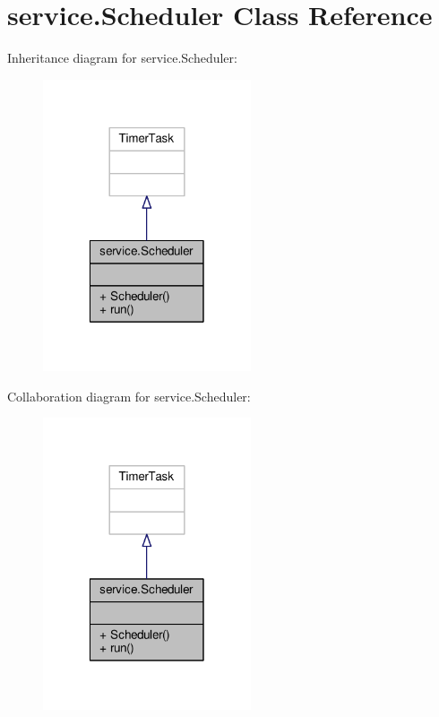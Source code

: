 \hypertarget{classservice_1_1Scheduler}{\section{service.\-Scheduler Class Reference}
\label{classservice_1_1Scheduler}
}


Inheritance diagram for service.\-Scheduler\-:\nopagebreak
\begin{figure}[H]
\begin{center}
\leavevmode
\includegraphics[width=174pt]{classservice_1_1Scheduler__inherit__graph}
\end{center}
\end{figure}


Collaboration diagram for service.\-Scheduler\-:\nopagebreak
\begin{figure}[H]
\begin{center}
\leavevmode
\includegraphics[width=174pt]{classservice_1_1Scheduler__coll__graph}
\end{center}
\end{figure}
